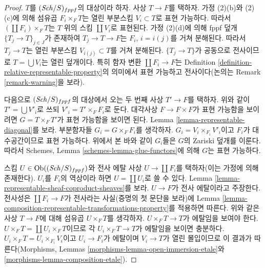 \begin{proof}
$T$를 $(\mathit{Sch}/S)_{fppf}$의 대상이라 하자. 사상 $T \to F$를 택하자.
가정 (2)(b)와 (2)(c)에 의해 섬유곱 $F_i \times_F T$는 열린 부분스킴
$V_i \subset T$로 표현 가능하다. 따라서
$(\coprod F_i) \times_F T$는 $T$ 위의 스킴 $\coprod V_i$로 표현된다.
가정 (2)(d)에 의해 fppf 덮개 $\{T_j \to T\}_{j \in J}$가 존재하여
$T_j \to T \to F$는 $F_i$, $i = i(j)$를 거쳐 분해된다.
따라서 $T_j \to T$는 열린 부분스킴 $V_{i(j)} \subset T$를 거쳐
분해된다. $\{T_j \to T\}$가 공동으로 전사이므로
$T = \bigcup V_i$는 열린 덮개이다. 특히 함자 변환
$\coprod F_i \to F$는 Definition
\ref{definition-relative-representable-property}의 의미에서 표현
가능하고 전사이다(논의는 Remark \ref{remark-warning}을 보라).

\medskip\noindent
다음으로 $(\mathit{Sch}/S)_{fppf}$의 대상에서 오는 두 번째 사상
$T' \to F$를 택하자. 위와 같이 $T' = \bigcup V'_i$로 쓰되
$V'_i = T' \times_F F_i$로 둔다. 대각사상 $F \to F \times F$가
표현 가능함을 보이려면 $G = T \times_F T'$가 표현 가능함을 보이면
된다. Lemma \ref{lemma-representable-diagonal}를 보라.
부분함자들 $G_i = G \times_F F_i$를 생각하자.
$G_i = V_i \times_{F_i} V'_i$이고 $F_i$가 대수공간이므로
표현 가능하다. 위에서 본 바와 같이 $G_i$들은 $G$의
Zariski 덮개를 이룬다. 따라서 Schemes, Lemma
\ref{schemes-lemma-glue-functors}에 의해 $G$는 표현 가능하다.

\medskip\noindent
스킴 $U \in \mathop{\mathrm{Ob}}\nolimits((\mathit{Sch}/S)_{fppf})$와 전사 에탈 사상
$U \to \coprod F_i$를 택하자(이는 가정에 의해 존재한다).
$U_i$를 $F_i$의 역상이라 하면 $U = \coprod U_i$로 쓸 수 있다.
Lemma \ref{lemma-representable-sheaf-coproduct-sheaves}를 보라.
$U \to F$가 전사 에탈이라고 주장한다. 전사성은
$\coprod F_i \to F$가 전사라는 사실(증명의 첫 문단을 보라)에
Lemma \ref{lemma-composition-representable-transformations-property}를
적용하면 따른다. 위와 같은 사상 $T \to F$에 대해 섬유곱
$U \times_F T$를 생각하자. $U \times_F T \to T$가 에탈임을 보여야
한다. $U \times_F T = \coprod U_i \times_F T$이므로 각
$U_i \times_F T \to T$가 에탈임을 보이면 충분하다.
$U_i \times_F T = U_i \times_{F_i} V_i$이고
$U_i \to F_i$가 에탈이며 $V_i \to T$가 열린 몰입이므로 이 결과가
따른다(Morphisms, Lemmas
\ref{morphisms-lemma-open-immersion-etale}와
\ref{morphisms-lemma-composition-etale}).
\end{proof}













